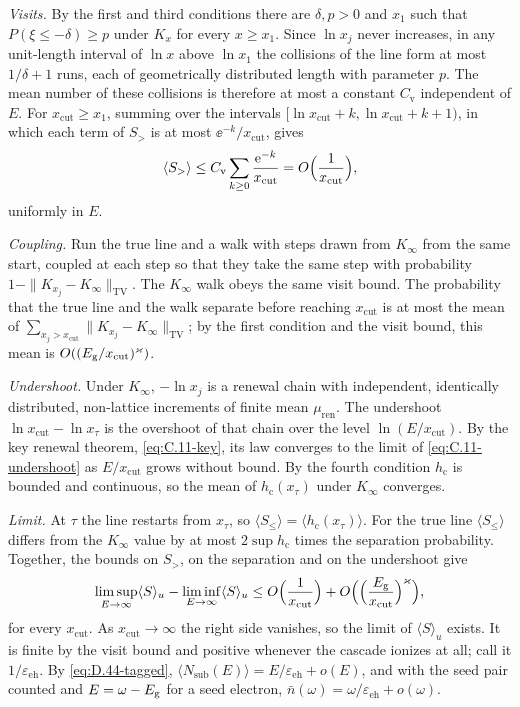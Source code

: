\emph{Visits.} By the first and third conditions there are $\delta, p > 0$ and $x_1$ such that $P(\xi \le -\delta) \ge p$ under $K_x$ for every $x \ge x_1$. Since $\ln x_j$ never increases, in any unit-length interval of $\ln x$ above $\ln x_1$ the collisions of the line form at most $1/\delta + 1$ runs, each of geometrically distributed length with parameter $p$. The mean number of these collisions is therefore at most a constant $C_{\mathrm{v}}$ independent of $E$. For $x_{\mathrm{cut}} \ge x_1$, summing over the intervals $[\ln x_{\mathrm{cut}} + k, \ln x_{\mathrm{cut}} + k + 1)$, in which each term of $S_>$ is at most $\ee^{-k}/x_{\mathrm{cut}}$, gives
\begin{equation*}
  \langle S_>\rangle \le C_{\mathrm{v}}\sum_{k \ge 0}\frac{\mathrm{e}^{-k}}{x_{\mathrm{cut}}} = O\Bigl(\frac{1}{x_{\mathrm{cut}}}\Bigr) ,
\end{equation*}
uniformly in $E$.

\emph{Coupling.} Run the true line and a walk with steps drawn from $K_\infty$ from the same start, coupled at each step so that they take the same step with probability $1 - \|K_{x_j} - K_\infty\|_{\mathrm{TV}}$. The $K_\infty$ walk obeys the same visit bound. The probability that the true line and the walk separate before reaching $x_{\mathrm{cut}}$ is at most the mean of $\sum_{x_j > x_{\mathrm{cut}}}\|K_{x_j} - K_\infty\|_{\mathrm{TV}}$; by the first condition and the visit bound, this mean is $O((E_{\mathrm{g}}/x_{\mathrm{cut}})^\varkappa)$.

\emph{Undershoot.} Under $K_\infty$, $-\ln x_j$ is a renewal chain with independent, identically distributed, non-lattice increments of finite mean $\mu_{\mathrm{ren}}$. The undershoot $\ln x_{\mathrm{cut}} - \ln x_\tau$ is the overshoot of that chain over the level $\ln(E/x_{\mathrm{cut}})$. By the key renewal theorem, \cref{eq:C.11-key}, its law converges to the limit of \cref{eq:C.11-undershoot} as $E/x_{\mathrm{cut}}$ grows without bound. By the fourth condition $h_{\mathrm{c}}$ is bounded and continuous, so the mean of $h_{\mathrm{c}}(x_\tau)$ under $K_\infty$ converges.

\emph{Limit.} At $\tau$ the line restarts from $x_\tau$, so $\langle S_\le\rangle = \langle h_{\mathrm{c}}(x_\tau)\rangle$. For the true line $\langle S_\le\rangle$ differs from the $K_\infty$ value by at most $2\sup h_{\mathrm{c}}$ times the separation probability. Together, the bounds on $S_>$, on the separation and on the undershoot give
\begin{equation*}
  \limsup_{E\to\infty}\langle S\rangle_u - \liminf_{E\to\infty}\langle S\rangle_u \le O\Bigl(\frac{1}{x_{\mathrm{cut}}}\Bigr) + O\Bigl(\Bigl(\frac{E_{\mathrm{g}}}{x_{\mathrm{cut}}}\Bigr)^\varkappa\Bigr) ,
\end{equation*}
for every $x_{\mathrm{cut}}$. As $x_{\mathrm{cut}} \to \infty$ the right side vanishes, so the limit of $\langle S\rangle_u$ exists. It is finite by the visit bound and positive whenever the cascade ionizes at all; call it $1/\varepsilon_{\mathrm{eh}}$. By \cref{eq:D.44-tagged}, $\langle N_{\mathrm{sub}}(E)\rangle = E/\varepsilon_{\mathrm{eh}} + o(E)$, and with the seed pair counted and $E = \omega - E_{\mathrm{g}}$ for a seed electron, $\bar n(\omega) = \omega/\varepsilon_{\mathrm{eh}} + o(\omega)$.

